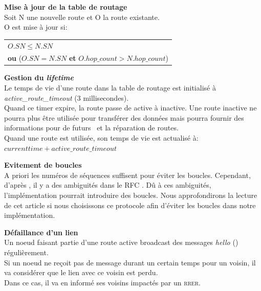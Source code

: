         \textbf{Mise à jour de la table de routage}\\
            Soit N une nouvelle route et O la route existante.\\
            O est mise à jour si:\\
            \begin{center}
                \begin{tabular}{|l|}
                    \hline
                    $O.SN \leq N.SN$ \\
                    \textbf{ou} ($O.SN = N.SN$ \textbf{et} $O.hop\_count > N.hop\_count$)\\
                    \hline
                \end{tabular}
            \end{center}
        
        \textbf{Gestion du \textit{lifetime}}\\
            Le temps de vie d'une route dans la table de routage est initialisé à \textit{active\_route\_timeout} (3 millisecondes).\\
            Quand ce timer expire, la route passe de active à inactive. Une route inactive ne pourra plus être utilisée pour transférer des données
            mais pourra fournir des informations pour de futurs \rreq\  et la réparation de routes.\\
            Quand une route est utilisée, son temps de vie  est actualisé à: $current time + active\_route\_timeout$

    \vspace{0.5cm}
    \textbf{Evitement de boucles}\\
        A priori les numéros de séquences suffisent pour éviter les boucles. Cependant, d'après \cite{loop_aodv_w}, il y a des
        ambiguités dans le RFC \cite{aodv_w}. Dû à ces ambiguités, l'implémentation pourrait introduire des boucles.
        Nous approfondirons la lecture de cet article si nous choisissons ce protocole afin d'éviter les boucles dans notre implémentation.

    \vspace{0.5cm}
    \textbf{Défaillance d'un lien}\\
        Un noeud faisant partie d'une route active broadcast des messages \textit{hello} (\rrep)
        régulièrement.\\
        Si un noeud ne reçoit pas de message durant un certain temps pour un voisin, il va considérer
        que le lien avec ce voisin est perdu.\\
        Dans ce cas, il va en informé ses voisins impactés par un \textsc{rrer}.